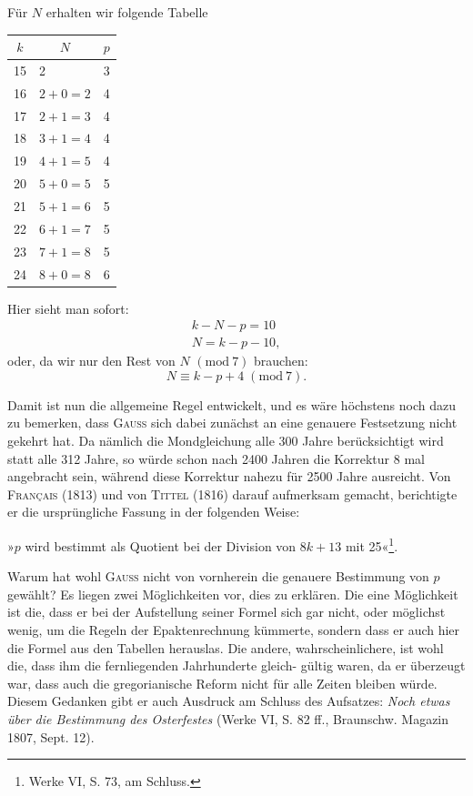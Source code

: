 Für $N$ erhalten wir folgende Tabelle
\begin{center}\setlength{\tabcolsep}{5pt}\renewcommand{\arraystretch}{1.15}
\begin{tabular}{c|l|c}\hline\hline
$k$&\multicolumn{1}{c|}{$N$}&$p$\\\hline\hline
15&2&3\\
16&$2+0=2$&4\\
17&$2+1=3$&4\\
18&$3+1=4$&4\\
19&$4+1=5$&4\\
20&$5+0=5$&5\\
21&$5+1=6$&5\\
22&$6+1=7$&5\\
23&$7+1=8$&5\\
24&$8+0=8$&6
\end{tabular}\end{center}
\noindent Hier sieht man sofort:
\[
\begin{gathered}
k-N-p=10\\
N=k-p-10,
\end{gathered}
\]
\noindent oder, da wir nur den Rest von $N$ $(\mathrm{mod}\ 7)$ brauchen:
\[
N\equiv k-p+4\; (\mathrm{mod}\ 7).
\]

Damit ist nun die allgemeine Regel entwickelt, und
es wäre höchstens noch dazu zu bemerken, dass \textsc{Gauss}
sich dabei zunächst an eine genauere Festsetzung nicht
gekehrt hat. Da nämlich die Mondgleichung alle 300
Jahre berücksichtigt wird statt alle 312 Jahre, so würde
schon nach 2400 Jahren die Korrektur 8 mal angebracht sein, während diese
Korrektur nahezu für 2500 Jahre ausreicht. Von \textsc{Français} (1813) und von
\textsc{Tittel} (1816) darauf aufmerksam gemacht, berichtigte er die ursprüngliche
Fassung in der folgenden Weise:

»$p$ wird bestimmt als Quotient bei der Division von $8k+13$ mit 25«\footnote{Werke VI, S. 73, am Schluss.}.
\par\noindent Warum hat wohl \textsc{Gauss} nicht von vornherein die genauere Bestimmung von
$p$ gewählt? Es liegen zwei Möglichkeiten vor, dies zu erklären. Die eine
Möglichkeit ist die, dass er bei der Aufstellung seiner Formel sich gar nicht,
oder möglichst wenig, um die Regeln der Epaktenrechnung kümmerte, sondern dass er auch hier die Formel aus den Tabellen herauslas. Die andere,
wahrscheinlichere, ist wohl die, dass ihm die fernliegenden Jahrhunderte gleich-
\clearpage{}
\setcounter{footnote}{0}
\noindent gültig waren, da er überzeugt war, dass auch die gregorianische Reform nicht
für alle Zeiten bleiben würde. Diesem Gedanken gibt er auch Ausdruck am
Schluss des Aufsatzes: \textit{Noch etwas über die Bestimmung des Osterfestes} (Werke
VI, S. 82 ff., Braunschw. Magazin 1807, Sept. 12).

